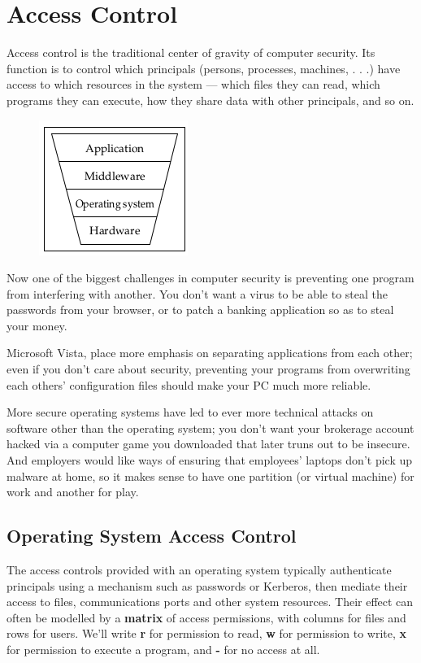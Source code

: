 \chapter{Access Control}
	
	\clearpage
	Access control is the traditional center of gravity of computer security. 
	Its function is to control which principals (persons, processes, machines, . . .) 
	have access to which resources in the system — which files they can read, which 
	programs they can execute, how they share data with other principals, and so on.

	\begin{figure}[H]
		\includegraphics[scale=0.6]{pics/layers.png}
	\end{figure}

	Now one of the biggest challenges in computer security is preventing one program 
	from interfering with another. You don’t want a virus to be able to steal the 
	passwords from your browser, or to patch a banking application so as to steal 
	your money. 

	Microsoft Vista, place more emphasis on separating applications from each other; 
	even if you don’t care about security, preventing your programs from overwriting 
	each others’ configuration files should make your PC much more reliable. 

	More secure operating systems have led to ever more technical attacks on software 
	other than the operating system; you don’t want your brokerage account hacked via 
	a computer game you downloaded that later truns out to be insecure. And employers 
	would like ways of ensuring that employees’ laptops don’t pick up malware at home, 
	so it makes sense to have one partition (or virtual machine) for work and another
	for play.

	\clearpage
	\section{Operating System Access Control}

		The access controls provided with an operating system typically authenticate
		principals using a mechanism such as passwords or Kerberos, then mediate
		their access to files, communications ports and other system resources.
		Their effect can often be modelled by a {\bf matrix} of access permissions, with
		columns for files and rows for users. We’ll write {\bf r} for permission to read, 
		{\bf w} for permission to write, {\bf x} for permission to execute a program, and 
		{\bf -} for no access at all.

